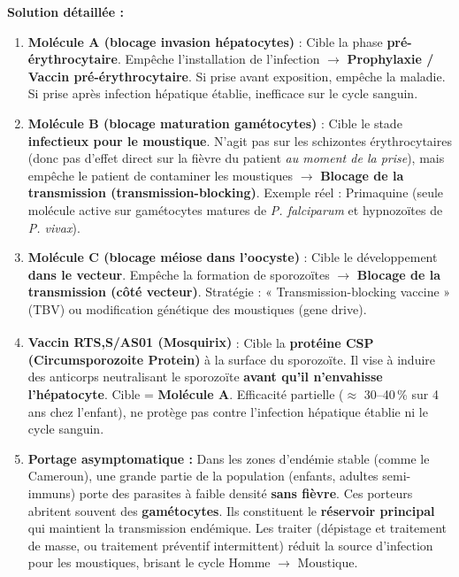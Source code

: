 \documentclass[11pt]{article}
\begin{document}
\begin{exoresolu}
\tcblower
\textbf{Solution détaillée :}
\begin{enumerate}
    \item \textbf{Molécule A (blocage invasion hépatocytes)} : Cible la phase \textbf{pré-érythrocytaire}. Empêche l'installation de l'infection $\to$ \textbf{Prophylaxie / Vaccin pré-érythrocytaire}. Si prise avant exposition, empêche la maladie. Si prise après infection hépatique établie, inefficace sur le cycle sanguin.
    \item \textbf{Molécule B (blocage maturation gamétocytes)} : Cible le stade \textbf{infectieux pour le moustique}. N'agit pas sur les schizontes érythrocytaires (donc pas d'effet direct sur la fièvre du patient \emph{au moment de la prise}), mais empêche le patient de contaminer les moustiques $\to$ \textbf{Blocage de la transmission (transmission-blocking)}. Exemple réel : Primaquine (seule molécule active sur gamétocytes matures de \emph{P. falciparum} et hypnozoïtes de \emph{P. vivax}).
    \item \textbf{Molécule C (blocage méiose dans l'oocyste)} : Cible le développement \textbf{dans le vecteur}. Empêche la formation de sporozoïtes $\to$ \textbf{Blocage de la transmission (côté vecteur)}. Stratégie : « Transmission-blocking vaccine » (TBV) ou modification génétique des moustiques (gene drive).
    \item \textbf{Vaccin RTS,S/AS01 (Mosquirix\textsuperscript{\textregistered})} : Cible la \textbf{protéine CSP (Circumsporozoite Protein)} à la surface du sporozoïte. Il vise à induire des anticorps neutralisant le sporozoïte \textbf{avant qu'il n'envahisse l'hépatocyte}. Cible = \textbf{Molécule A}. Efficacité partielle ($\approx$ 30--40\,\% sur 4 ans chez l'enfant), ne protège pas contre l'infection hépatique établie ni le cycle sanguin.
    \item \textbf{Portage asymptomatique :} Dans les zones d'endémie stable (comme le Cameroun), une grande partie de la population (enfants, adultes semi-immuns) porte des parasites à faible densité \textbf{sans fièvre}. Ces porteurs abritent souvent des \textbf{gamétocytes}. Ils constituent le \textbf{réservoir principal} qui maintient la transmission endémique. Les traiter (dépistage et traitement de masse, ou traitement préventif intermittent) réduit la source d'infection pour les moustiques, brisant le cycle Homme $\to$ Moustique.
\end{enumerate}
\end{exoresolu}
\end{document}
